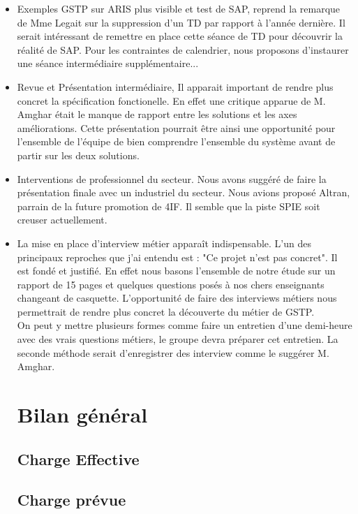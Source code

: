 \begin{itemize}
\item Exemples GSTP sur ARIS plus visible et test de SAP, reprend la remarque 
de Mme Legait sur la suppression d'un TD par rapport à l'année dernière. 
Il serait intéressant de remettre en place cette séance de TD pour découvrir 
la réalité de SAP.
Pour les contraintes de calendrier, nous proposons d'instaurer une séance 
intermédiaire supplémentaire...
\item Revue et Présentation intermédiaire, Il apparait important de rendre plus
concret la spécification fonctionelle. En effet une critique apparue de M. Amghar
était le manque de rapport entre les solutions et les axes améliorations. Cette
présentation pourrait être ainsi une opportunité pour l'ensemble de l'équipe de 
bien comprendre l'ensemble du système avant de partir sur les deux solutions.
\item Interventions de professionnel du secteur. Nous avons suggéré de faire 
la présentation finale avec un industriel du secteur. Nous avions proposé Altran, 
parrain de la future promotion de 4IF. Il semble que la piste SPIE soit creuser 
actuellement.
\item La mise en place d'interview métier apparaît indispensable. L'un des principaux
reproches que j'ai entendu est : "Ce projet n'est pas concret". Il est fondé et justifié.
 En effet nous basons l'ensemble de notre étude sur un rapport de 15 pages et quelques
questions posés à nos chers enseignants changeant de casquette. L'opportunité de faire
des interviews métiers nous permettrait de rendre plus concret la découverte du métier
de GSTP. \\
On peut y mettre plusieurs formes comme faire un entretien d'une demi-heure avec 
des vrais questions métiers, le groupe devra préparer cet entretien. La seconde
méthode serait d'enregistrer des interview comme le suggérer M. Amghar.

\section{Bilan général}

\subsection{Charge Effective}


\subsection{Charge prévue}



\end{itemize}
